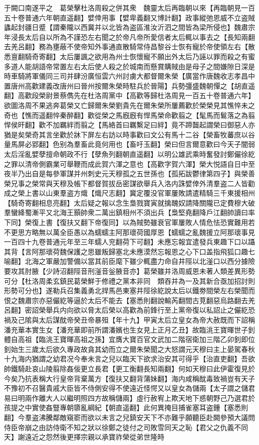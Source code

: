 于闕口南遂平之　葛榮擊杜洛周殺之併其衆　魏靈太后再臨朝以來【再臨朝見一百五十卷普通六年朝直遥翻】嬖倖用事【嬖卑義翻又博計翻】政事縱弛恩威不立盗賊蠭起封疆日蹙【謂秦隴以西冀并以北皆為盗區淮汝沂泗之間皆為梁所侵也】魏肅宗年浸長太后自以所為不謹恐左右聞之於帝凡帝所愛信者太后輒以事去之【長知兩翻去羌呂翻】務為壅蔽不使帝知外事通直散騎常侍昌黎谷士恢有寵於帝使領左右【散悉亶翻騎奇寄翻】太后屢諷之欲用為州士恢懷寵不願出外太后乃誣以罪而殺之有蜜多道人能胡語帝常置左右太后使人殺之於城南而懸賞購賊由是母子之間嫌隙日深是時車騎將軍儀同三司并肆汾廣恒雲六州討虜大都督爾朱榮【廣當作唐魏收志孝昌中置唐州高歡建義改唐州曰晉州按爾朱榮時駐兵於晉陽】兵勢彊盛魏朝憚之【胡直遥翻】高歡段榮尉景蔡儁先在杜洛周黨中【高歡等歸杜洛周見一百五十卷普通六年】欲圖洛周不果逃奔葛榮又亡歸爾朱榮劉貴先在爾朱榮所屢薦歡於榮榮見其憔悴未之奇也【憔而遥翻悴秦醉翻】歡從榮之馬廐廐有悍馬榮命歡翦之【髦馬而鬄落之為翦悍侯旰翻】歡不加羈絆而翦之【馬絡首曰羈繫足曰絆】竟不蹄齧起謂榮曰御惡人亦猶是矣榮奇其言坐歡於牀下屏左右訪以時事歡曰文公有馬十二谷【榮畜牧蕃庶以谷量馬屏必郢翻】色别為羣畜此竟何用也【畜吁玉翻】榮曰但言爾意歡曰今天子闇弱太后淫亂嬖孽擅命朝政不行【孽魚列翻朝直遥翻】以明公雄武乘時奮發討鄭儼徐紇之罪以清帝側霸業可舉鞭而成此賀六渾之意也【高歡字賀六渾】榮大悦語自日中至夜半乃出自是每參軍謀并州刺史元天穆孤之五世孫也【孤拓跋鬱律第四子】與榮善榮兄事之榮常與天穆及帳下都督賀拔岳密謀欲舉兵入洛内誅嬖倖外清羣盗二人皆勸成之榮上書以山東羣盗方熾【熾尺志翻】冀定覆没官軍屢敗請遣精騎三千東援相州【騎奇寄翻相息亮翻】太后疑之報以念生梟戮寶寅就擒醜奴請降關隴已定費穆大破羣蠻絳蜀漸平又北海王顥帥衆二萬出鎮相州不須出兵【梟堅堯翻降戶江翻帥讀曰率下同】榮復上書【復扶又翻下帝復同】以為賊勢雖衰官軍屢敗人情危怯恐實難用若不更思方略無以萬全臣愚以為蠕蠕主阿那瓌荷國厚恩【蠕蠕之亂魏援立阿那瓌事見一百四十九卷普通元年至三年蠕人兖翻荷下可翻】未應忘報宜遣發兵東趣下口以躡其背【言阿那瓌荷魏保護之思雖叛歸塞北未應漠然忘報恩之心下口盖指飛狐口趣七喻翻】北海之軍嚴加警備以當其前臣麾下雖少輒盡力命自井陘以北滏口以西分據險要攻其肘腋【少詩沼翻陘音刑滏音釡腋音亦】葛榮雖并洛周威恩未著人類差異形勢可分【杜洛周柔玄鎮民葛榮鮮于修禮之黨本非同　類吞并為一及其新合亟加招討則形勢可分也】遂勒兵召集義勇北捍馬邑東塞井陘徐紇說太后以鐵劵間榮左右榮聞而恨之魏肅宗亦惡儼紇等逼於太后不能去【塞悉則翻說輸芮翻間古莧翻惡烏路翻去羌呂翻】密詔榮舉兵内向欲以脅太后榮以高歡為前鋒行至上黨帝復以私詔止之儼紇恐禍及己隂與太后謀酖帝癸丑帝暴殂【年十九】甲寅太后立皇女為帝大赦既而下詔稱潘充華本實生女【潘充華即前所謂潘嬪也生女見上正月乙丑】故臨洮王寶暉世子釗體自高祖【臨洮王寶暉高祖之孫】宜膺大寶百官文武加二階宿衛加三階乙卯釗即位釗始生三歲太后欲久專政故貪其幼而立之爾朱榮聞之大怒謂元天穆曰主上晏駕春秋十九海内猶謂之幼君况今奉未言之兒以臨天下欲求治安其可得乎【治直吏翻】吾欲帥鐵騎赴哀山陵翦除姦佞更立長君【更工衡翻長知兩翻】何如天穆曰此伊霍復見於今矣乃抗表稱大行皇帝背棄萬方【復扶又翻背蒲妹翻】海内咸稱酖毒致禍豈有天子不豫初不召醫貴戚大臣皆不侍側安得不使遠近怪愕又以皇女為儲兩【太子謂之儲君易曰明兩作離大人以繼明照四方故稱儲兩】虛行赦宥上欺天地下惑朝野己乃選君於孩提之中實使姦豎專朝隳亂綱紀【朝直遥翻】此何異掩目捕雀塞耳盗鍾【塞悉則翻】今羣盗沸騰鄰敵窺窬而欲以未言之兒鎮安天下不亦難乎願聽臣赴闕參預大議問侍臣帝崩之由訪侍衛不知之狀以徐鄭之徒付之司敗雪同天之恥【君父之仇義不同天】謝遠近之怨然後更擇宗親以承寶祚榮從弟世隆時